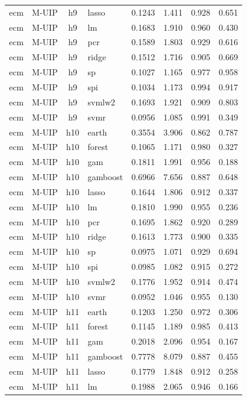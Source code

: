 \begin{ThreePartTable}
\begin{longtable}[t]{llclcccc}
ecm & M-UIP & h9 & lasso & 0.1243 & 1.411 & 0.928 & 0.651\\
ecm & M-UIP & h9 & lm & 0.1683 & 1.910 & 0.960 & 0.430\\
ecm & M-UIP & h9 & pcr & 0.1589 & 1.803 & 0.929 & 0.616\\
ecm & M-UIP & h9 & ridge & 0.1512 & 1.716 & 0.905 & 0.669\\
ecm & M-UIP & h9 & sp & 0.1027 & 1.165 & 0.977 & 0.958\\
ecm & M-UIP & h9 & spi & 0.1034 & 1.173 & 0.994 & 0.917\\
ecm & M-UIP & h9 & svmlw2 & 0.1693 & 1.921 & 0.909 & 0.803\\
ecm & M-UIP & h9 & svmr & 0.0956 & 1.085 & 0.991 & 0.349\\
\addlinespace
ecm & M-UIP & h10 & earth & 0.3554 & 3.906 & 0.862 & 0.787\\
ecm & M-UIP & h10 & forest & 0.1065 & 1.171 & 0.980 & 0.327\\
ecm & M-UIP & h10 & gam & 0.1811 & 1.991 & 0.956 & 0.188\\
ecm & M-UIP & h10 & gamboost & 0.6966 & 7.656 & 0.887 & 0.648\\
ecm & M-UIP & h10 & lasso & 0.1644 & 1.806 & 0.912 & 0.337\\
ecm & M-UIP & h10 & lm & 0.1810 & 1.990 & 0.955 & 0.236\\
ecm & M-UIP & h10 & pcr & 0.1695 & 1.862 & 0.920 & 0.289\\
ecm & M-UIP & h10 & ridge & 0.1613 & 1.773 & 0.900 & 0.335\\
ecm & M-UIP & h10 & sp & 0.0975 & 1.071 & 0.929 & 0.694\\
ecm & M-UIP & h10 & spi & 0.0985 & 1.082 & 0.915 & 0.272\\
ecm & M-UIP & h10 & svmlw2 & 0.1776 & 1.952 & 0.914 & 0.474\\
ecm & M-UIP & h10 & svmr & 0.0952 & 1.046 & 0.955 & 0.130\\
\addlinespace
ecm & M-UIP & h11 & earth & 0.1203 & 1.250 & 0.972 & 0.306\\
ecm & M-UIP & h11 & forest & 0.1145 & 1.189 & 0.985 & 0.413\\
ecm & M-UIP & h11 & gam & 0.2018 & 2.096 & 0.954 & 0.167\\
ecm & M-UIP & h11 & gamboost & 0.7778 & 8.079 & 0.887 & 0.455\\
ecm & M-UIP & h11 & lasso & 0.1779 & 1.848 & 0.912 & 0.258\\
ecm & M-UIP & h11 & lm & 0.1988 & 2.065 & 0.946 & 0.166\\

\end{longtable}
\end{ThreePartTable}
